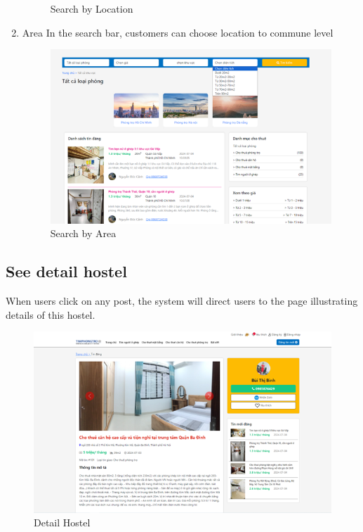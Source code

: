 \documentclass[../Main.tex]{subfiles}
\begin{document}
\begin{enumerate}
\begin{figure}[H]
              \caption{Search by Location}
          \end{figure}
    \item Area
          In the search bar, customers can choose location to commune level
          \begin{figure}[H]
              \centering
              \includegraphics[width=\textwidth]{Figure/Picture25.png}
              \caption{Search by Area}
          \end{figure}
\end{enumerate}

\subsection{See detail hostel}

When users click on any post, the system will direct users to the page illustrating details of this hostel.

\begin{figure}[H]
    \centering
    \includegraphics[width=\textwidth]{Figure/Picture26.png}
    \caption{Detail Hostel}
\end{figure}
\end{document}
